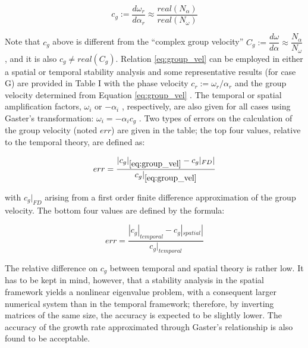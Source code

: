 \begin{equation}
c_g := \dfrac{d \omega_r}{d \alpha_r} \approx \dfrac{real(N_{\alpha})}{real(N_{\omega})}
\label{eq:group_vel}
\end{equation}

Note that $c_g$ above is different from the “complex group velocity” $C_g := \dfrac{d \omega}{d \alpha} \approx  \dfrac{N_{\alpha}}{N_{\omega}}$ , and it is also
$c_g \neq real(C_g)$. Relation \eqref{eq:group_vel} can be employed in either a spatial or temporal stability analysis and
some representative results (for case G) are provided in Table I with the phase velocity $c_r := \omega_r / \alpha_r$
and the group velocity determined from Equation \eqref{eq:group_vel} . The temporal or spatial amplification factors, $\omega_i$ or $-\alpha_i$ , respectively, are also given for all cases using Gaster’s transformation: $\omega_i = - \alpha_i c_g$ .
Two types of errors on the calculation of the group velocity (noted $err$) are given in the table; the top
four values, relative to the temporal theory, are defined as:

$$
err = \dfrac{|c_g|_{\eqref{eq:group_vel}} - c_g|_{FD}|}{c_g|_{\eqref{eq:group_vel}}}
$$

with $c_g|_{FD}$ arising from a first order finite difference approximation of the group velocity. The
bottom four values are defined by the formula:

$$
err = \dfrac{|c_g|_{temporal} - c_g|_{spatial}|}{c_g|_{temporal}}
$$

The relative difference on $c_g$ between temporal and spatial theory is rather low. It has to be kept
in mind, however, that a stability analysis in the spatial framework yields a nonlinear eigenvalue
problem, with a consequent larger numerical system than in the temporal framework; therefore, by
inverting matrices of the same size, the accuracy is expected to be slightly lower. The accuracy of
the growth rate approximated through Gaster’s relationship is also found to be acceptable.

